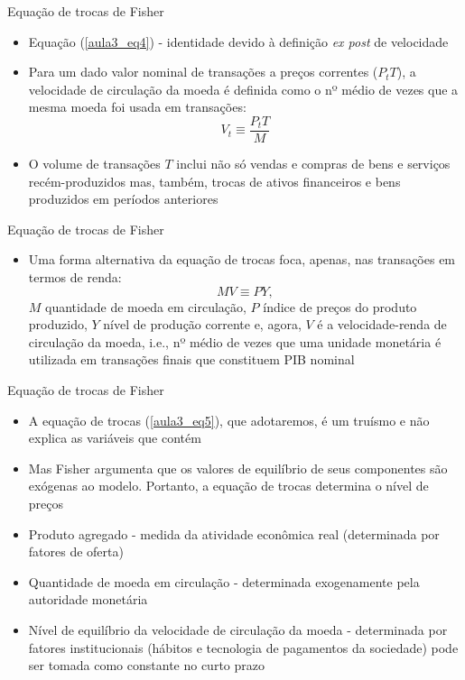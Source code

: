 \documentclass[10pt]{beamer}
\begin{document}
\begin{frame}
    {Equação de trocas de Fisher}
    \begin{itemize}
        \item Equação (\ref{aula3_eq4}) - identidade devido à definição \emph{ex post} de velocidade\bigskip
        \item Para um dado valor nominal de transações a preços correntes ($P_tT$), a velocidade de circulação da moeda é definida como o nº médio de vezes que a mesma moeda foi usada em transações:
        \[
          V_t \equiv \frac{P_tT}{M}  
        \]
        \item O volume de transações $T$ inclui não só vendas e compras de bens e serviços recém-produzidos mas, também, trocas de ativos financeiros e bens produzidos em períodos anteriores
    \end{itemize}
\end{frame}

\begin{frame}
    {Equação de trocas de Fisher}
    \begin{itemize}
        \item Uma forma alternativa da equação de trocas foca, apenas, nas transações em termos de renda:
        \begin{equation}
            MV \equiv PY,
            \label{aula3_eq5}
        \end{equation}
        $M$ quantidade de moeda em circulação, $P$ índice de preços do produto produzido, $Y$ nível de produção corrente e, agora, $V$ é a velocidade-renda de circulação da moeda, i.e., nº médio de vezes que uma unidade monetária é utilizada em transações finais que constituem PIB nominal
    \end{itemize}
\end{frame}

\begin{frame}
    {Equação de trocas de Fisher}
    \begin{itemize}
        \item A equação de trocas (\ref{aula3_eq5}), que adotaremos, é um truísmo e não explica as variáveis que contém\bigskip
        \item Mas Fisher argumenta que os valores de equilíbrio de seus componentes são exógenas ao modelo. Portanto, a equação de trocas determina o nível de preços\bigskip
        \item Produto agregado - medida da atividade econômica real (determinada por fatores de oferta)\bigskip
        \item Quantidade de moeda em circulação - determinada exogenamente pela autoridade monetária\bigskip
        \item Nível de equilíbrio da velocidade de circulação da moeda - determinada por fatores institucionais (hábitos e tecnologia de pagamentos da sociedade) pode ser tomada como constante no curto prazo
    \end{itemize}
\end{frame}
\end{document}
